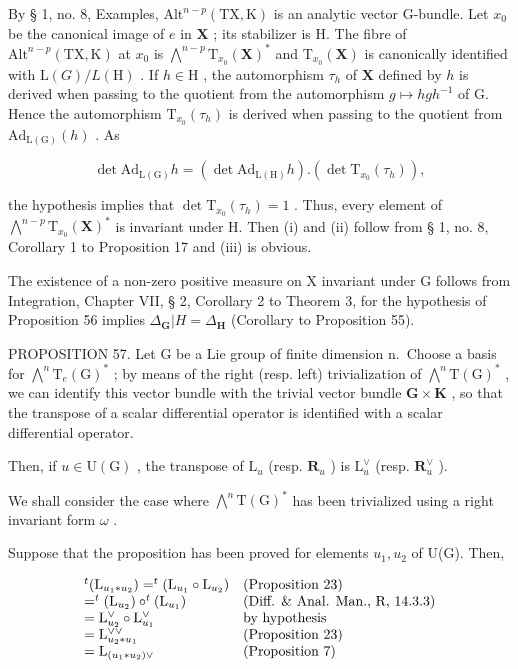 By § 1, no. 8, Examples, \(\mathrm{Alt}^{n - p}(\mathrm{TX},\mathrm{K})\) is an analytic vector G-bundle. Let \(x_0\) be the canonical image of \(e\) in \(\mathbf{X}\) ; its stabilizer is H. The fibre of \(\mathrm{Alt}^{n - p}(\mathrm{TX},\mathrm{K})\) at \(x_0\) is \(\bigwedge^{n - p}\mathrm{T}_{x_0}(\mathbf{X})^*\) and \(\mathrm{T}_{x_0}(\mathbf{X})\) is canonically identified with \(\mathrm{L}(G) / L(\mathrm{H})\) . If \(h\in \mathrm{H}\) , the automorphism \(\tau_h\) of \(\mathbf{X}\) defined by \(h\) is derived when passing to the quotient from the automorphism \(g\mapsto hgh^{-1}\) of G. Hence the automorphism \(\mathrm{T}_{x_0}(\tau_h)\) is derived when passing to the quotient from \(\mathrm{Ad}_{\mathrm{L(G)}}(h)\) . As

\[
\det \mathrm{Ad} _ {\mathrm{L(G)}} h = (\det \mathrm{Ad} _ {\mathrm{L(H)}} h). (\det \mathrm{T} _ {x _ {0}} (\tau_ {h})),
\]

the hypothesis implies that \(\det \mathrm{T}_{x_0}(\tau_h) = 1\) . Thus, every element of \(\bigwedge^{n - p}\mathrm{T}_{x_0}(\mathbf{X})^*\) is invariant under H. Then (i) and (ii) follow from § 1, no. 8, Corollary 1 to Proposition 17 and (iii) is obvious.

The existence of a non-zero positive measure on X invariant under G follows from Integration, Chapter VII, § 2, Corollary 2 to Theorem 3, for the hypothesis of Proposition 56 implies \(\Delta_{\mathbf{G}}|H = \Delta_{\mathbf{H}}\) (Corollary to Proposition 55).

PROPOSITION 57. Let G be a Lie group of finite dimension n.~Choose a basis for \(\bigwedge^{n}\mathrm{T}_{e}(\mathrm{G})^{*}\) ; by means of the right (resp. left) trivialization of \(\bigwedge^{n}\mathrm{T}(\mathrm{G})^{*}\) , we can identify this vector bundle with the trivial vector bundle \(\mathbf{G} \times \mathbf{K}\) , so that the transpose of a scalar differential operator is identified with a scalar differential operator.

Then, if \(u \in \mathrm{U}(\mathrm{G})\) , the transpose of \(\mathrm{L}_u\) (resp. \(\mathbf{R}_u\) ) is \(\mathrm{L}_u^\vee\) (resp. \(\mathbf{R}_u^\vee\) ).

We shall consider the case where \(\bigwedge^{n}\mathrm{T}(\mathrm{G})^{*}\) has been trivialized using a right invariant form \(\omega\) .

Suppose that the proposition has been proved for elements \(u_{1}, u_{2}\) of U(G). Then,

\[
\begin{array}{l l} ^ {t} (\mathrm{L} _ {u _ {1} * u _ {2}}) = ^ {t} (\mathrm{L} _ {u _ {1}} \circ \mathrm{L} _ {u _ {2}}) & \text {(Proposition 23)} \\ = ^ {t} (\mathrm{L} _ {u _ {2}}) \circ^ {t} (\mathrm{L} _ {u _ {1}}) & \text {(Diff. \& Anal. Man., R, 14.3.3)} \\ = \mathrm{L} _ {u _ {2}} ^ {\vee} \circ \mathrm{L} _ {u _ {1}} ^ {\vee} & \text {by hypothesis} \\ = \mathrm{L} _ {u _ {2} * u _ {1}} ^ {\vee \vee} & \text {(Proposition 23)} \\ = \mathrm{L} _ {(u _ {1} * u _ {2}) \vee} & \text {(Proposition 7)} \end{array}
\]

